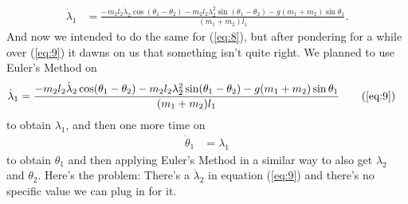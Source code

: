 \documentclass[paper=a4, fontsize=11pt]{scrartcl} %
\numberwithin{equation}{section} %
\numberwithin{figure}{section} %
\numberwithin{table}{section} %
\begin{document}
\begin{align} \label{eq:9}
   \dot{\lambda}_1 &= \frac{- m_2 l_2 \dot{\lambda}_2 \cos(\theta_1 - \theta_2) - m_2 l_2 \lambda^2_2 \sin(\theta_1 - \theta_2) - g (m_1 + m_2) \sin \theta_1}{(m_1 + m_2) l_1}.
\end{align}
And now we intended to do the same for (\ref{eq:8}), but after pondering for a while over (\ref{eq:9}) it dawns on us that something isn't quite right.
We planned to use Euler's Method on
\begin{align} 
  \dot{\lambda}_1 &= \frac{- m_2 l_2 \dot{\lambda}_2 \cos(\theta_1 - \theta_2) - m_2 l_2 \lambda^2_2 \sin(\theta_1 - \theta_2) - g (m_1 + m_2) \sin \theta_1}{(m_1 + m_2) l_1} \tag{\ref{eq:9}}
\end{align}
to obtain $\lambda_1$, and then one more time on
\begin{align} 
  \dot{\theta}_1 &= \lambda_1 \label{eq:10} 
\end{align}
to obtain $\theta_1$ and then applying Euler's Method in a similar way to also get $\lambda_2$ and $\theta_2$. Here's the problem: There's a $\dot{\lambda}_2$ in equation (\ref{eq:9}) and there's no specific value we can plug in 
for it.
\end{document}
